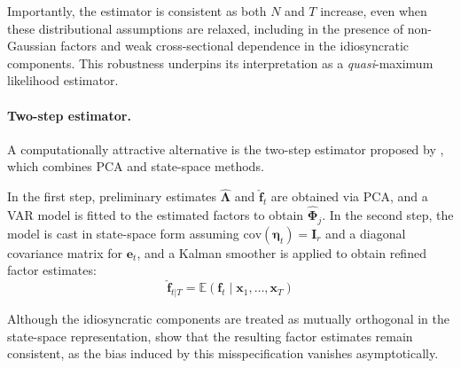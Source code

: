 Importantly, the estimator is consistent as both $N$ and $T$ increase, even when these distributional assumptions are relaxed, including in the presence of non-Gaussian factors and weak cross-sectional dependence in the idiosyncratic components. This robustness underpins its interpretation as a \textit{quasi}-maximum likelihood estimator.

\paragraph{Two-step estimator.}

A computationally attractive alternative is the two-step estimator proposed by \citet{doz2011two}, which combines PCA and state-space methods.

In the first step, preliminary estimates $\hat{\boldsymbol{\Lambda}}$ and $\hat{\boldsymbol{f}}_t$ are obtained via PCA, and a VAR model is fitted to the estimated factors to obtain $\hat{\boldsymbol{\Phi}}_j$. In the second step, the model is cast in state-space form assuming $\text{cov}(\boldsymbol{\eta}_t) = \boldsymbol{I}_r$ and a diagonal covariance matrix for $\boldsymbol{e}_t$, and a Kalman smoother is applied to obtain refined factor estimates:
\begin{equation}
\hat{\boldsymbol{f}}_{t|T} = \mathbb{E}(\boldsymbol{f}_t \mid \boldsymbol{x}_1, \dots, \boldsymbol{x}_T)
\end{equation}

Although the idiosyncratic components are treated as mutually orthogonal in the state-space representation, \citet{doz2011two} show that the resulting factor estimates remain consistent, as the bias induced by this misspecification vanishes asymptotically.

